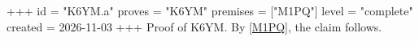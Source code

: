 +++
id = "K6YM.a"
proves = "K6YM"
premises = ["M1PQ"]
level = "complete"
created = 2026-11-03
+++
Proof of K6YM. By \ref{M1PQ}, the claim follows.
